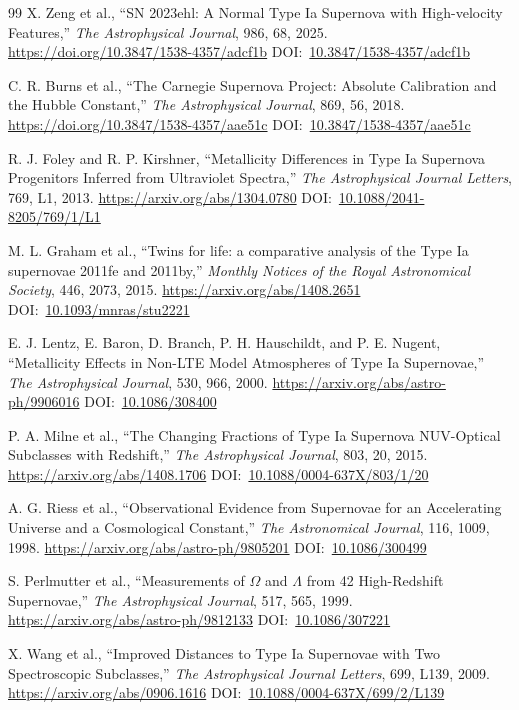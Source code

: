 \documentclass[10pt,onecolumn]{article}
\newcommand{\doi}[1]{DOI:~\href{https://doi.org/#1}{#1}}
\begin{document}
\begin{thebibliography}{99}
X. Zeng et al.,
``SN 2023ehl: A Normal Type Ia Supernova with High-velocity Features,''
\emph{The Astrophysical Journal}, 986, 68, 2025.
\url{https://doi.org/10.3847/1538-4357/adcf1b}
\doi{10.3847/1538-4357/adcf1b}

C. R. Burns et al.,
``The Carnegie Supernova Project: Absolute Calibration and the Hubble Constant,''
\emph{The Astrophysical Journal}, 869, 56, 2018.
\url{https://doi.org/10.3847/1538-4357/aae51c}
\doi{10.3847/1538-4357/aae51c}

R. J. Foley and R. P. Kirshner,
``Metallicity Differences in Type Ia Supernova Progenitors Inferred from Ultraviolet Spectra,''
\emph{The Astrophysical Journal Letters}, 769, L1, 2013.
\url{https://arxiv.org/abs/1304.0780}
\doi{10.1088/2041-8205/769/1/L1}

M. L. Graham et al.,
``Twins for life: a comparative analysis of the Type Ia supernovae 2011fe and 2011by,''
\emph{Monthly Notices of the Royal Astronomical Society}, 446, 2073, 2015.
\url{https://arxiv.org/abs/1408.2651}
\doi{10.1093/mnras/stu2221}

E. J. Lentz, E. Baron, D. Branch, P. H. Hauschildt, and P. E. Nugent,
``Metallicity Effects in Non-LTE Model Atmospheres of Type Ia Supernovae,''
\emph{The Astrophysical Journal}, 530, 966, 2000.
\url{https://arxiv.org/abs/astro-ph/9906016}
\doi{10.1086/308400}

P. A. Milne et al.,
``The Changing Fractions of Type Ia Supernova NUV-Optical Subclasses with Redshift,''
\emph{The Astrophysical Journal}, 803, 20, 2015.
\url{https://arxiv.org/abs/1408.1706}
\doi{10.1088/0004-637X/803/1/20}

A. G. Riess et al.,
``Observational Evidence from Supernovae for an Accelerating Universe and a Cosmological Constant,''
\emph{The Astronomical Journal}, 116, 1009, 1998.
\url{https://arxiv.org/abs/astro-ph/9805201}
\doi{10.1086/300499}

S. Perlmutter et al.,
``Measurements of $\Omega$ and $\Lambda$ from 42 High-Redshift Supernovae,''
\emph{The Astrophysical Journal}, 517, 565, 1999.
\url{https://arxiv.org/abs/astro-ph/9812133}
\doi{10.1086/307221}

X. Wang et al.,
``Improved Distances to Type Ia Supernovae with Two Spectroscopic Subclasses,''
\emph{The Astrophysical Journal Letters}, 699, L139, 2009.
\url{https://arxiv.org/abs/0906.1616}
\doi{10.1088/0004-637X/699/2/L139}


\end{thebibliography}
\end{document}
